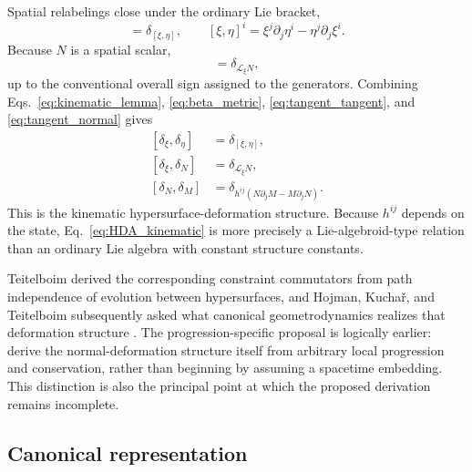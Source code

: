 \documentclass[11pt]{article}
\begin{document}
Spatial relabelings close under the ordinary Lie bracket,
\begin{equation}
    [\delta_\xi,\delta_\eta]
    =\delta_{[\xi,\eta]},
    \qquad
    [\xi,\eta]^i
    =\xi^j\partial_j\eta^i-\eta^j\partial_j\xi^i.
    \label{eq:tangent_tangent}
\end{equation}
Because $N$ is a spatial scalar,
\begin{equation}
    [\delta_\xi,\delta_N]
    =\delta_{\mathcal L_\xi N},
    \label{eq:tangent_normal}
\end{equation}
up to the conventional overall sign assigned to the generators. Combining Eqs.~\eqref{eq:kinematic_lemma}, \eqref{eq:beta_metric}, \eqref{eq:tangent_tangent}, and \eqref{eq:tangent_normal} gives
\begin{equation}
\boxed{
\begin{aligned}
[\delta_\xi,\delta_\eta]
&=\delta_{[\xi,\eta]},\\
[\delta_\xi,\delta_N]
&=\delta_{\mathcal L_\xi N},\\
[\delta_N,\delta_M]
&=\delta_{h^{ij}(N\partial_jM-M\partial_jN)}.
\end{aligned}}
\label{eq:HDA_kinematic}
\end{equation}
This is the kinematic hypersurface-deformation structure. Because $h^{ij}$ depends on the state, Eq.~\eqref{eq:HDA_kinematic} is more precisely a Lie-algebroid-type relation than an ordinary Lie algebra with constant structure constants.

Teitelboim derived the corresponding constraint commutators from path independence of evolution between hypersurfaces, and Hojman, Kucha\v{r}, and Teitelboim subsequently asked what canonical geometrodynamics realizes that deformation structure \cite{Teitelboim1973,HKT1976}. The progression-specific proposal is logically earlier: derive the normal-deformation structure itself from arbitrary local progression and conservation, rather than beginning by assuming a spacetime embedding. This distinction is also the principal point at which the proposed derivation remains incomplete.

\subsection{Canonical representation}
\end{document}
